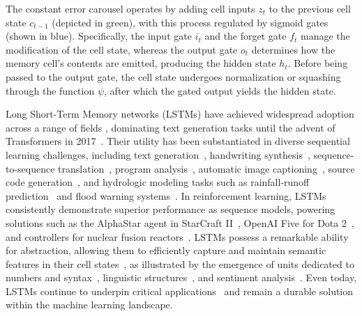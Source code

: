 The constant error carousel operates by adding cell inputs $z_t$ to the previous cell state $c_{t-1}$ (depicted in green), with this process regulated by sigmoid gates (shown in blue). Specifically, the input gate $i_t$ and the forget gate $f_t$ manage the modification of the cell state, whereas the output gate $o_t$ determines how the memory cell's contents are emitted, producing the hidden state $h_t$. Before being passed to the output gate, the cell state undergoes normalization or squashing through the function $\psi$, after which the gated output yields the hidden state.

Long Short-Term Memory networks (LSTMs) have achieved widespread adoption across a range of fields \citep{Hochreiter:01,Hochreiter:07,Schmidhuber:15}, dominating text generation tasks until the advent of Transformers in 2017~\citep{Vaswani:17}. Their utility has been substantiated in diverse sequential learning challenges, including text generation~\citep{Graves:13,Karpathy:15blog}, handwriting synthesis~\citep{Graves:13}, sequence-to-sequence translation~\citep{Sutskever:14nips}, program analysis~\citep{Zaremba:14arxiv}, automatic image captioning~\citep{Karpathy:15,Hossain:19}, source code generation~\citep{Karpathy:15blog}, and hydrologic modeling tasks such as rainfall-runoff prediction~\citep{Kratzert:18,Kratzert:19} and flood warning systems~\citep{Nearing:24}. In reinforcement learning, LSTMs consistently demonstrate superior performance as sequence models, powering solutions such as the AlphaStar agent in StarCraft II~\citep{Vinyals:17short}, OpenAI Five for Dota 2~\citep{OpenAI:19}, and controllers for nuclear fusion reactors~\citep{Degrave:22short}. LSTMs possess a remarkable ability for abstraction, allowing them to efficiently capture and maintain semantic features in their cell states~\citep{Karpathy:15blog}, as illustrated by the emergence of units dedicated to numbers and syntax~\citep{Lakretz:19}, linguistic structures~\citep{Bau:19}, and sentiment analysis~\citep{Radford:17arxiv}. Even today, LSTMs continue to underpin critical applications~\citep{Degrave:22short,Nearing:24} and remain a durable solution within the machine learning landscape.

